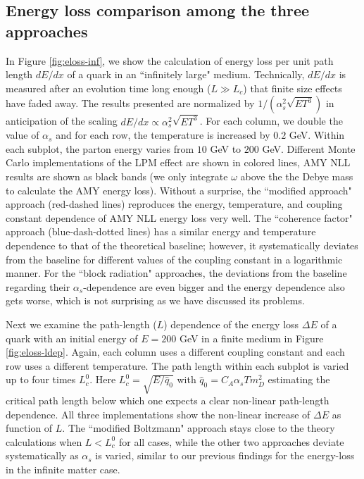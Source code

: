 \subsection{Energy loss comparison among the three approaches}
In Figure \ref{fig:eloss-inf}, we show the calculation of energy loss per unit path length $dE/dx$ of a quark in an ``infinitely large" medium. 
Technically, $dE/dx$ is measured after an evolution time long enough ($L\gg L_c$) that finite size effects have faded away.
The results presented are normalized by $1/(\alpha_s^2 \sqrt{ET^3})$ in anticipation of the scaling $dE/dx \propto \alpha_s^2 \sqrt{ET^3}$.
For each column, we double the value of $\alpha_s$ and for each row, the temperature is increased by $0.2$ GeV. 
Within each subplot, the parton energy varies from $10$ GeV to $200$ GeV.
Different Monte Carlo implementations of the LPM effect are shown in colored lines, AMY NLL results are shown as black bands (we only integrate $\omega$ above the the Debye mass to calculate the AMY energy loss). 
Without a surprise, the ``modified approach" approach (red-dashed lines) reproduces the energy, temperature, and coupling constant dependence of AMY NLL energy loss very well.
The ``coherence factor" approach (blue-dash-dotted lines) has a similar energy and temperature dependence to that of the theoretical baseline; however, it systematically deviates from the baseline for different values of the coupling constant in a logarithmic manner.
For the ``block radiation" approaches, the deviations from the baseline regarding their $\alpha_s$-dependence are even bigger and the energy dependence also gets worse, which is not surprising as we have discussed its problems.

Next we examine the path-length ($L$) dependence of the energy loss $\Delta E$ of a quark with an initial energy of $E = 200$ GeV in a finite medium in Figure \ref{fig:eloss-ldep}.
Again, each column uses a different coupling constant and each row uses a different temperature. 
The path length within each subplot is varied up to four times $L_c^0$.
Here $L_c^0 = \sqrt{E/\hat{q}_0}$ with $\hat{q}_0 = C_A \alpha_s T m_D^2$ estimating the critical path length below which one expects a clear non-linear path-length dependence.
All three implementations show the non-linear increase of $\Delta E$ as function of $L$.
The ``modified Boltzmann" approach stays close to the theory calculations when $L<L_c^0$ for all cases, while the other two approaches deviate systematically as $\alpha_s$ is varied, similar to our previous findings for the energy-loss in the infinite matter case.

